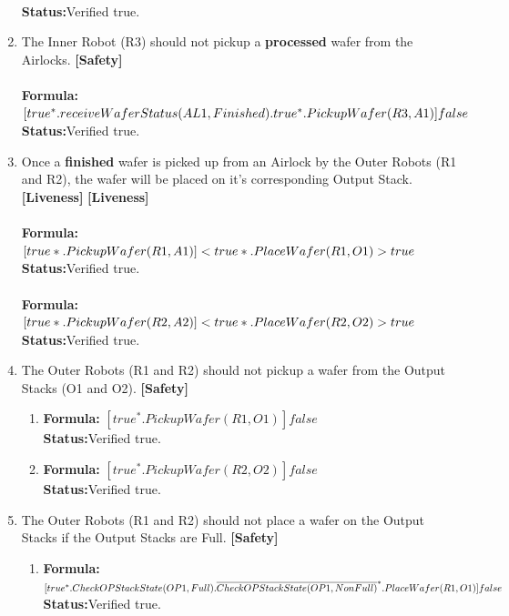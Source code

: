 \documentclass[a4paper,12pt]{article}
\begin{document}
\begin{enumerate}
		\\\textbf{Status:}Verified true.
		\item The Inner Robot (R3) should not pickup a \textbf{processed} wafer from the Airlocks. \textbf{[Safety]}
		\\
		\\\textbf{Formula:} $[true^*. receiveWaferStatus(AL1, Finished). true^*. 
		\\PickupWafer(R3, A1)] false $
		\\\textbf{Status:}Verified true.
		\item Once a \textbf{finished} wafer is picked up from an Airlock by the Outer Robots (R1 and R2), the wafer will be placed on it's corresponding Output Stack. \textbf{[Liveness]} \textbf{[Liveness]}
		\\
		\\\textbf{Formula:} $[true*.PickupWafer(R1, A1)] <true*.\\PlaceWafer(R1,O1)>true$
		\\\textbf{Status:}Verified true.
		\\
		\\\textbf{Formula:} $[true*.PickupWafer(R2, A2)] <true*.\\PlaceWafer(R2,O2)> true$
		\\\textbf{Status:}Verified true.
		\item The Outer Robots (R1 and R2) should not pickup a wafer from the Output Stacks (O1 and O2). \textbf{[Safety]}
		\begin{enumerate}
			\item \textbf{Formula:} $[true^* . PickupWafer(R1, O1)] false$
			\\\textbf{Status:}Verified true.
			\item \textbf{Formula:} $[true^* . PickupWafer(R2, O2)] false$
			\\\textbf{Status:}Verified true.
		\end{enumerate}
		\item The Outer Robots (R1 and R2) should not place a wafer on the Output Stacks if the Output Stacks are Full. \textbf{[Safety]}
		\begin{enumerate}
			
			\item \textbf{Formula:} $[true^* . CheckOPStackState(OP1,Full). \\\overline{CheckOPStackState(OP1, NonFull)}^* .PlaceWafer(R1, O1)] false $
			\\\textbf{Status:}Verified true.
			

\end{enumerate}
\end{enumerate}
\end{document}
